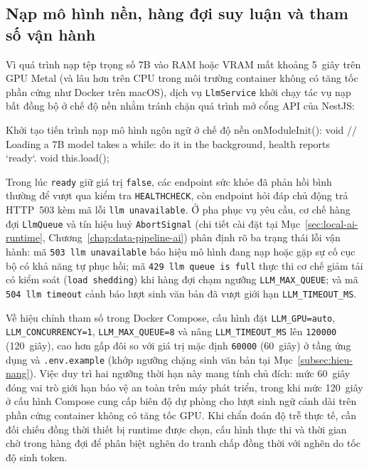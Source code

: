 \subsection{Nạp mô hình nền, hàng đợi suy luận và tham số vận hành}
\label{subsec:nap-nen-hang-doi}

Vì quá trình nạp tệp trọng số 7B vào RAM hoặc VRAM mất khoảng 5~giây trên GPU Metal (và lâu hơn trên CPU trong môi trường container không có tăng tốc phần cứng như Docker trên macOS), dịch vụ \texttt{LlmService} khởi chạy tác vụ nạp bất đồng bộ ở chế độ nền nhằm tránh chặn quá trình mở cổng API của NestJS:

\begin{tsbox}{Khởi tạo tiến trình nạp mô hình ngôn ngữ ở chế độ nền}
onModuleInit(): void {
  // Loading a 7B model takes a while: do it in the background, health reports `ready`.
  void this.load();
}
\end{tsbox}

Trong lúc \texttt{ready} giữ giá trị \texttt{false}, các endpoint sức khỏe đã phản hồi bình thường để vượt qua kiểm tra \texttt{HEALTHCHECK}, còn endpoint hỏi đáp chủ động trả HTTP~503 kèm mã lỗi \texttt{llm unavailable}. Ở pha phục vụ yêu cầu, cơ chế hàng đợi \texttt{LlmQueue} và tín hiệu huỷ \texttt{AbortSignal} (chi tiết cài đặt tại Mục~\ref{sec:local-ai-runtime}, Chương~\ref{chap:data-pipeline-ai}) phân định rõ ba trạng thái lỗi vận hành: mã \texttt{503 llm unavailable} báo hiệu mô hình đang nạp hoặc gặp sự cố cục bộ có khả năng tự phục hồi; mã \texttt{429 llm queue is full} thực thi cơ chế giảm tải có kiểm soát (\texttt{load shedding}) khi hàng đợi chạm ngưỡng \texttt{LLM\_\allowbreak{}MAX\_\allowbreak{}QUEUE}; và mã \texttt{504 llm timeout} cảnh báo lượt sinh văn bản đã vượt giới hạn \texttt{LLM\_\allowbreak{}TIMEOUT\_\allowbreak{}MS}.

Về hiệu chỉnh tham số trong Docker Compose, cấu hình đặt \texttt{LLM\_\allowbreak{}GPU=\allowbreak{}auto}, \texttt{LLM\_\allowbreak{}CONCURRENCY=\allowbreak{}1}, \texttt{LLM\_\allowbreak{}MAX\_\allowbreak{}QUEUE=\allowbreak{}8} và nâng \texttt{LLM\_\allowbreak{}TIMEOUT\_\allowbreak{}MS} lên \texttt{120000} (120~giây), cao hơn gấp đôi so với giá trị mặc định \texttt{60000} (60~giây) ở tầng ứng dụng và \texttt{.\allowbreak{}env.\allowbreak{}example} (khớp ngưỡng chặng sinh văn bản tại Mục~\ref{subsec:hieu-nang}). Việc duy trì hai ngưỡng thời hạn này mang tính chủ đích: mức 60~giây đóng vai trò giới hạn bảo vệ an toàn trên máy phát triển, trong khi mức 120~giây ở cấu hình Compose cung cấp biên độ dự phòng cho lượt sinh ngữ cảnh dài trên phần cứng container không có tăng tốc GPU. Khi chẩn đoán độ trễ thực tế, cần đối chiếu đồng thời thiết bị runtime được chọn, cấu hình thực thi và thời gian chờ trong hàng đợi để phân biệt nghẽn do tranh chấp đồng thời với nghẽn do tốc độ sinh token.

